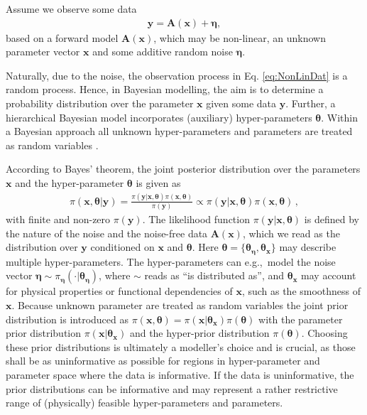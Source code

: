 Assume we observe some data
\begin{align}
	\bm{y} = \bm{A} (\bm{x}) + \bm{\eta},
	\label{eq:NonLinDat}
\end{align}
based on a forward model $\bm{A}(\bm{x})$, which may be non-linear, an unknown parameter vector $\bm{x}$ and some additive random noise $\bm{\eta}$.

Naturally, due to the noise, the observation process in Eq. \ref{eq:NonLinDat} is a random process.
Hence, in Bayesian modelling, the aim is to determine a probability distribution over the parameter $\bm{x}$ given some data $\bm{y}$.
Further, a hierarchical Bayesian model incorporates (auxiliary) hyper-parameters $\bm{\theta}$.
Within a Bayesian approach all unknown hyper-parameters and parameters are treated as random variables \cite[Chapter 3]{kaipio2005statinv}.

According to Bayes' theorem, the joint posterior distribution over the parameters $\bm{x}$ and the hyper-parameter $\bm{\theta}$ is given as
\begin{align}
	\pi(\bm{x},\bm{\theta}|\bm{y}) = \frac{ \pi(\bm{y} | \bm{x}, \bm{\theta} ) \pi(\bm{x}, \bm{\theta})}{\pi(\bm{y})} \propto \pi(\bm{y} | \bm{x}, \bm{\theta} ) \pi(\bm{x}, \bm{\theta}) \, ,
\end{align}
with finite and non-zero $\pi(\bm{y})$.
The likelihood function $\pi(\bm{y}|\bm{x},\bm{\theta})$ is defined by the nature of the noise and the noise-free data $\bm{A}(\bm{x})$, which we read as the distribution over $\bm{y}$ conditioned on $\bm{x}$ and $\bm{\theta}$.
Here $\bm{\theta}=\{\bm{\theta}_{\bm{\eta}},\bm{\theta}_{\bm{x}}\}$ may describe multiple hyper-parameters.
The hyper-parameters can e.g.,~model the noise vector $\bm{\eta} \sim \pi_{\bm{\eta}}(\cdot|\bm{\theta}_{\bm{\eta}})$, where $\sim$ reads as ``is distributed as'', and $\bm{\theta}_{\bm{x}}$ may account for physical properties or functional dependencies of $\bm{x}$, such as the smoothness of $\bm{x}$.
Because unknown parameter are treated as random variables the joint prior distribution is introduced as $\pi(\bm{x}, \bm{\theta}) = \pi(\bm{x}|\bm{\theta}_{\bm{x}}) \pi(\bm{\theta})$ with the parameter prior distribution $\pi(\bm{x}|\bm{\theta}_{\bm{x}})$ and the hyper-prior distribution $\pi(\bm{\theta})$.
Choosing these prior distributions is ultimately a modeller's choice and is crucial, as those shall be as uninformative as possible for regions in hyper-parameter and parameter space where the data is informative.
If the data is uninformative, the prior distributions can be informative and may represent a rather restrictive range of (physically) feasible hyper-parameters and parameters.

